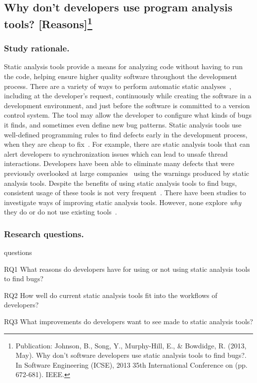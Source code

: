 \documentclass{llncs}
\begin{document}
\subsection{Why don't developers use program analysis tools? [Reasons]\protect\footnote{Publication: Johnson, B., Song, Y., Murphy-Hill, E., \& Bowdidge, R. (2013, May). Why don't software developers use static analysis tools to find bugs?. In Software Engineering (ICSE), 2013 35th International Conference on (pp. 672-681). IEEE.}}\label{subsec:s1}

\subsubsection{Study rationale.} Static analysis tools provide a means for analyzing code without having to run
the code, helping ensure higher quality software throughout the development process. There are a variety of ways to perform automatic static
analyses~\cite{Gegick:2007:AutomatedAnalysis}, including at the developer's request, continuously while creating the software in a development
environment, and just before the software is committed to a version control system. The tool may allow the developer to configure what kinds of bugs it
finds, and sometimes even define new bug patterns. Static analysis tools use well-defined programming rules to find defects early in the development process, when they
are cheap to fix~\cite{Ayewah:2008:FindBugs}. For example, there are static analysis tools that can alert developers to synchronization issues which can
lead to unsafe thread interactions. Developers have been able to eliminate many defects that were previously overlooked at large companies~\cite{Ayewah:2010:GFF} using the warnings produced
by static analysis tools. 
Despite the benefits of using static analysis tools to find bugs, consistent usage of these tools is not very frequent~\cite{Ayewah:2008:FindBugs}. 
There have been studies to investigate ways of improving static analysis tools. However, none explore \emph{why} they do or do not use existing tools~\cite{Bessey:2010:Coverity,Khoo:2008:PathProjection}. 

\subsubsection{Research questions.}
\begin{labeling}{questions}
	\item [RQ1] What reasons do developers have for using or not using static analysis tools to find bugs?
	\item [RQ2] How well do current static analysis tools fit into the workflows of developers? 
	\item [RQ3] What improvements do developers want to see made to static analysis tools?
\end{labeling}
\end{document}
